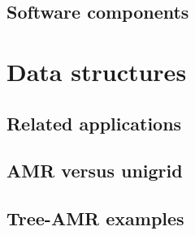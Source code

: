 \documentclass{beamer}
\begin{document}







\subsection{Software components}













\section{Data structures}

\subsection{Related applications}






\subsection{AMR versus unigrid}







\subsection{Tree-AMR examples}
\end{document}
